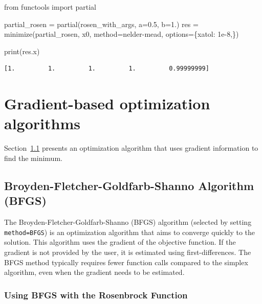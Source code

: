 \documentclass[
  letterpaper,
  DIV=11,
  numbers=noendperiod]{scrreprt}
\newenvironment{Shaded}{\begin{snugshade}}{\end{snugshade}}
\newcommand{\BuiltInTok}[1]{\textcolor[rgb]{0.00,0.23,0.31}{#1}}
\newcommand{\FloatTok}[1]{\textcolor[rgb]{0.68,0.00,0.00}{#1}}
\newcommand{\ImportTok}[1]{\textcolor[rgb]{0.00,0.46,0.62}{#1}}
\newcommand{\NormalTok}[1]{\textcolor[rgb]{0.00,0.23,0.31}{#1}}
\newcommand{\OperatorTok}[1]{\textcolor[rgb]{0.37,0.37,0.37}{#1}}
\newcommand{\StringTok}[1]{\textcolor[rgb]{0.13,0.47,0.30}{#1}}
\begin{document}
\begin{Shaded}
\begin{Highlighting}[]
\ImportTok{from}\NormalTok{ functools }\ImportTok{import}\NormalTok{ partial}

\NormalTok{partial\_rosen }\OperatorTok{=}\NormalTok{ partial(rosen\_with\_args, a}\OperatorTok{=}\FloatTok{0.5}\NormalTok{, b}\OperatorTok{=}\FloatTok{1.}\NormalTok{)}
\NormalTok{res }\OperatorTok{=}\NormalTok{ minimize(partial\_rosen, x0, method}\OperatorTok{=}\StringTok{\textquotesingle{}nelder{-}mead\textquotesingle{}}\NormalTok{,}
\NormalTok{               options}\OperatorTok{=}\NormalTok{\{}\StringTok{\textquotesingle{}xatol\textquotesingle{}}\NormalTok{: }\FloatTok{1e{-}8}\NormalTok{,\})}

\BuiltInTok{print}\NormalTok{(res.x)}
\end{Highlighting}
\end{Shaded}

\begin{verbatim}
[1.         1.         1.         1.         0.99999999]
\end{verbatim}

\hypertarget{gradient-based-optimization-algorithms}{%
\section{Gradient-based optimization
algorithms}\label{gradient-based-optimization-algorithms}}

Section~\ref{sec-bfgs} presents an optimization algorithm that uses
gradient information to find the minimum.

\hypertarget{sec-bfgs}{%
\subsection{Broyden-Fletcher-Goldfarb-Shanno Algorithm
(BFGS)}\label{sec-bfgs}}

The Broyden-Fletcher-Goldfarb-Shanno (BFGS) algorithm (selected by
setting \texttt{method=\textquotesingle{}BFGS\textquotesingle{}}) is an
optimization algorithm that aims to converge quickly to the solution.
This algorithm uses the gradient of the objective function. If the
gradient is not provided by the user, it is estimated using
first-differences. The BFGS method typically requires fewer function
calls compared to the simplex algorithm, even when the gradient needs to
be estimated.

\hypertarget{using-bfgs-with-the-rosenbrock-function}{%
\subsubsection{Using BFGS with the Rosenbrock
Function}\label{using-bfgs-with-the-rosenbrock-function}}
\end{document}
